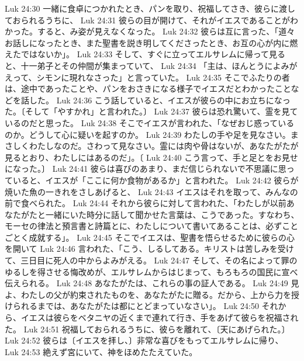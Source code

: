 Luk 24:30  一緒に食卓につかれたとき、パンを取り、祝福してさき、彼らに渡しておられるうちに、
Luk 24:31  彼らの目が開けて、それがイエスであることがわかった。すると、み姿が見えなくなった。
Luk 24:32  彼らは互に言った、「道々お話しになったとき、また聖書を説き明してくださったとき、お互の心が内に燃えたではないか」。
Luk 24:33  そして、すぐに立ってエルサレムに帰って見ると、十一弟子とその仲間が集まっていて、
Luk 24:34  「主は、ほんとうによみがえって、シモンに現れなさった」と言っていた。
Luk 24:35  そこでふたりの者は、途中であったことや、パンをおさきになる様子でイエスだとわかったことなどを話した。
Luk 24:36  こう話していると、イエスが彼らの中にお立ちになった。〔そして「やすかれ」と言われた。〕
Luk 24:37  彼らは恐れ驚いて、霊を見ているのだと思った。
Luk 24:38  そこでイエスが言われた、「なぜおじ惑っているのか。どうして心に疑いを起すのか。
Luk 24:39  わたしの手や足を見なさい。まさしくわたしなのだ。さわって見なさい。霊には肉や骨はないが、あなたがたが見るとおり、わたしにはあるのだ」。〔
Luk 24:40  こう言って、手と足とをお見せになった。〕
Luk 24:41  彼らは喜びのあまり、まだ信じられないで不思議に思っていると、イエスが「ここに何か食物があるか」と言われた。
Luk 24:42  彼らが焼いた魚の一きれをさしあげると、
Luk 24:43  イエスはそれを取って、みんなの前で食べられた。
Luk 24:44  それから彼らに対して言われた、「わたしが以前あなたがたと一緒にいた時分に話して聞かせた言葉は、こうであった。すなわち、モーセの律法と預言書と詩篇とに、わたしについて書いてあることは、必ずことごとく成就する」。
Luk 24:45  そこでイエスは、聖書を悟らせるために彼らの心を開いて
Luk 24:46  言われた、「こう、しるしてある。キリストは苦しみを受けて、三日目に死人の中からよみがえる。
Luk 24:47  そして、その名によって罪のゆるしを得させる悔改めが、エルサレムからはじまって、もろもろの国民に宣べ伝えられる。
Luk 24:48  あなたがたは、これらの事の証人である。
Luk 24:49  見よ、わたしの父が約束されたものを、あなたがたに贈る。だから、上から力を授けられるまでは、あなたがたは都にとどまっていなさい」。
Luk 24:50  それから、イエスは彼らをベタニヤの近くまで連れて行き、手をあげて彼らを祝福された。
Luk 24:51  祝福しておられるうちに、彼らを離れて、〔天にあげられた。〕
Luk 24:52  彼らは〔イエスを拝し、〕非常な喜びをもってエルサレムに帰り、
Luk 24:53  絶えず宮にいて、神をほめたたえていた。


